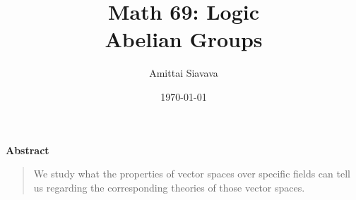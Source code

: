\title{
  \Huge{Math 69: Logic}\\
  Abelian Groups
}
\date{\Large{\today}}

\begin{titlingpage}

  \author{\Large{Amittai Siavava}}
  \maketitle

  \step
  \begin{center}
    \textbf{Abstract}
  \end{center}
  \step
  \begin{quote}
    \small
    We study what the properties of vector spaces over specific fields
    can tell us regarding the corresponding theories of those vector spaces.
  \end{quote}
\end{titlingpage}

